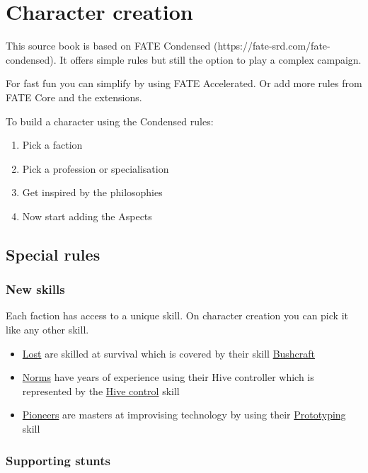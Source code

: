 \chapter{Character creation}

This source book is based on FATE Condensed (https://fate-srd.com/fate-condensed). It offers simple rules but still the option to play a complex campaign.

For fast fun you can simplify by using FATE Accelerated.
Or add more rules from FATE Core and the extensions.

To build a character using the Condensed rules:

\begin{enumerate}
    \item Pick a faction
    \item Pick a profession or specialisation
    \item Get inspired by the philosophies
    \item Now start adding the Aspects
\end{enumerate}

\section{Special rules}

\subsection{New skills}

Each faction has access to a unique skill. On character creation you can pick it like any other skill.

\begin{itemize}
    \item \hyperref[sec: Lost]{Lost} are skilled at survival which is covered by their skill \hyperref[sec: Bushcraft skill]{Bushcraft}
    \item \hyperref[sec: Norms]{Norms} have years of experience using their Hive controller which is represented by the \hyperref[sec:Hive control skill]{Hive control} skill
    \item \hyperref[sec: Pioneers]{Pioneers} are masters at improvising technology by using their \hyperref[sec:Prototyping skill]{Prototyping} skill
\end{itemize}

\subsection{Supporting stunts}

